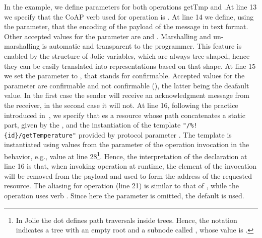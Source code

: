 In the example, we define  parameters for both operations \code
{getTmp} and .\@ At line 13 we specify that the CoAP verb used for
operation  is . At line 14 we define, using the
 parameter, that the encoding of the payload of the message
in text format. Other accepted values for the  parameter
are  and . Marshalling and un-marshalling is automatic
and transparent to the programmer. This feature is enabled by the structure of
Jolie variables, which are always tree-shaped, hence they can be easily
translated into representations based on that shape. At line 15 we set the
 parameter to , that stands for confirmable.
Accepted values for the  parameter are confirmable and not
confirmable (), the latter being the deafault value. In the first
case the sender will receive an acknowledgment message from the receiver, in the
second case it will not. At line 16, following the practice introduced
in~\cite{montesi16}, we specify that  es a resource
whose path concatenates a static part, given by the , and the
instantiation of the template \lstinline|"/%!{id}/getTemperature"| provided by
protocol parameter . The template is instantiated using values from
the parameter of the operation invocation in the behavior, e.g., value 
at line 28\footnote{In Jolie the dot  defines path traversals inside
trees. Hence, the notation  indicates a tree with an empty
root and a subnode called , whose value is .}. Hence, the
interpretation of the declaration at line 16 is that, when invoking operation
 at runtime, the element  of the invocation will be
removed from the payload and used to form the address of the requested resource.
The aliasing for operation  (line 21) is similar to that of
, while the operation uses verb . Since here the
 parameter is omitted, the default  is
used.

